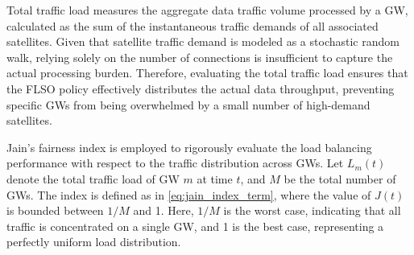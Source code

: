 Total traffic load measures the aggregate data traffic volume processed by a GW, calculated as the sum of the instantaneous traffic demands of all associated satellites. Given that satellite traffic demand is modeled as a stochastic random walk, relying solely on the number of connections is insufficient to capture the actual processing burden. Therefore, evaluating the total traffic load ensures that the FLSO policy effectively distributes the actual data throughput, preventing specific GWs from being overwhelmed by a small number of high-demand satellites.

Jain's fairness index is employed to rigorously evaluate the load balancing performance with respect to the traffic distribution across GWs. Let $L_m(t)$ denote the total traffic load of GW $m$ at time $t$, and $M$ be the total number of GWs. The index is defined as in \ref{eq:jain_index_term}, where the value of $J(t)$ is bounded between $1/M$ and 1. Here, $1/M$ is the worst case, indicating that all traffic is concentrated on a single GW, and 1 is the best case, representing a perfectly uniform load distribution.

